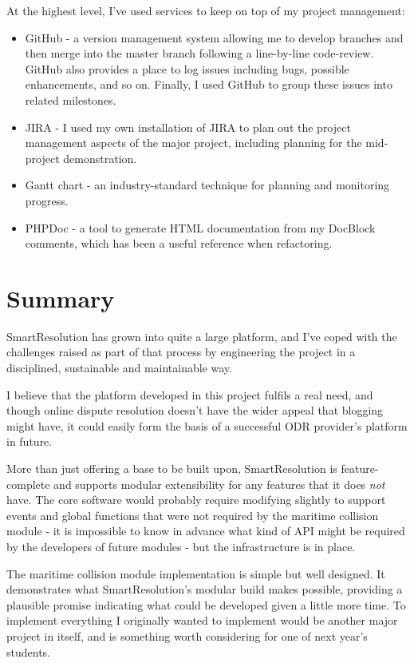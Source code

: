 At the highest level, I've used services to keep on top of my project management:

\begin{itemize}
\item GitHub - a version management system allowing me to develop branches and then merge into the master branch following a line-by-line code-review. GitHub also provides a place to log issues including bugs, possible enhancements, and so on. Finally, I used GitHub to group these issues into related milestones.
\item JIRA - I used my own installation of JIRA to plan out the project management aspects of the major project, including planning for the mid-project demonstration.
\item Gantt chart - an industry-standard technique for planning and monitoring progress.
\item PHPDoc - a tool to generate HTML documentation from my DocBlock comments, which has been a useful reference when refactoring.
\end{itemize}

\section{Summary}

SmartResolution has grown into quite a large platform, and I've coped with the challenges raised as part of that process by engineering the project in a disciplined, sustainable and maintainable way.

I believe that the platform developed in this project fulfils a real need, and though online dispute resolution doesn't have the wider appeal that blogging might have, it could easily form the basis of a successful ODR provider's platform in future.

More than just offering a base to be built upon, SmartResolution is feature-complete and supports modular extensibility for any features that it does \emph{not} have. The core software would probably require modifying slightly to support events and global functions that were not required by the maritime collision module - it is impossible to know in advance what kind of API might be required by the developers of future modules - but the infrastructure is in place.

The maritime collision module implementation is simple but well designed. It demonstrates what SmartResolution's modular build makes possible, providing a plausible promise indicating what could be developed given a little more time. To implement everything I originally wanted to implement would be another major project in itself, and is something worth considering for one of next year's students.

